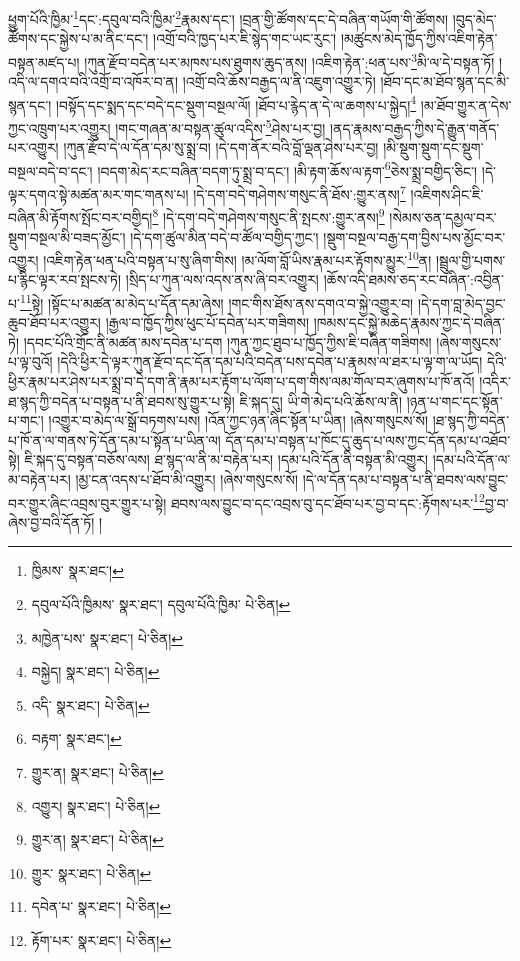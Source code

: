 ཕྱུག་པོའི་ཁྱིམ་\footnote{ཁྱིམས་  སྣར་ཐང་། }དང་:དབུལ་བའི་ཁྱིམ་\footnote{དབུལ་པོའི་ཁྱིམས་  སྣར་ཐང་། དབུལ་པོའི་ཁྱིམ་  པེ་ཅིན། }རྣམས་དང་། །བྲན་གྱི་ཚོགས་དང་དེ་བཞིན་གཡོག་གི་ཚོགས། །བུད་མེད་ཚོགས་དང་སྐྱེས་པ་མ་ནིང་དང་། །འགྲོ་བའི་ཁྱད་པར་ཇི་སྙེད་གང་ཡང་རུང་། །མཚུངས་མེད་ཁྱོད་ཀྱིས་འཇིག་རྟེན་བསྟན་མཛད་པ། །ཀུན་རྫོབ་བདེན་པར་མཁས་པས་ཐུགས་ཆུད་ནས། །འཇིག་རྟེན་:ཕན་པས་\footnote{མཁྱེན་པས་  སྣར་ཐང་།  པེ་ཅིན། }མི་ལ་དེ་བསྟན་ཏོ། །འདི་ལ་དགའ་བའི་འགྲོ་བ་འཁོར་བ་ན། །འགྲོ་བའི་ཆོས་བརྒྱད་ལ་ནི་འཇུག་འགྱུར་ཏེ། །ཐོབ་དང་མ་ཐོབ་སྙན་དང་མི་སྙན་དང་། །བསྟོད་དང་སྨད་དང་བདེ་དང་སྡུག་བསྔལ་ལོ། །ཐོབ་པ་རྙེད་ན་དེ་ལ་ཆགས་པ་སྐྱེད།\footnote{བསྐྱེད།  སྣར་ཐང་།  པེ་ཅིན། } །མ་ཐོབ་གྱུར་ན་དེས་ཀྱང་འཁྲུག་པར་འགྱུར། །གང་གཞན་མ་བསྟན་ཚུལ་འདིས་\footnote{འདི་  སྣར་ཐང་།  པེ་ཅིན། }ཤེས་པར་བྱ། །ནད་རྣམས་བརྒྱད་ཀྱིས་དེ་རྒྱུན་གནོད་པར་འགྱུར། །ཀུན་རྫོབ་དེ་ལ་དོན་དམ་སུ་སྨྲ་བ། །དེ་དག་ནོར་བའི་བློ་ལྡན་ཤེས་པར་བྱ། །མི་སྡུག་སྡུག་དང་སྡུག་བསྔལ་བདེ་བ་དང་། །བདག་མེད་རང་བཞིན་བདག་ཏུ་སྨྲ་བ་དང་། །མི་རྟག་ཆོས་ལ་རྟག་\footnote{བརྟག་  སྣར་ཐང་། }ཅེས་སྨྲ་བགྱིད་ཅིང་། །དེ་ལྟར་དགའ་སྟེ་མཚན་མར་གང་གནས་པ། །དེ་དག་བདེ་གཤེགས་གསུང་ནི་ཐོས་:གྱུར་ནས།\footnote{གྱུར་ན།  སྣར་ཐང་།  པེ་ཅིན། } །འཇིགས་ཤིང་ཇི་བཞིན་མི་རྟོགས་སྤོང་བར་བགྱིད།\footnote{འགྱུར།  སྣར་ཐང་།  པེ་ཅིན། } །དེ་དག་བདེ་གཤེགས་གསུང་ནི་སྤངས་:གྱུར་ནས།\footnote{གྱུར་ན།  སྣར་ཐང་།  པེ་ཅིན། } །སེམས་ཅན་དམྱལ་བར་སྡུག་བསྔལ་མི་བཟད་མྱོང་། །དེ་དག་ཚུལ་མིན་བདེ་བ་ཚོལ་བགྱིད་ཀྱང་། །སྡུག་བསྔལ་བརྒྱ་དག་བྱིས་པས་མྱོང་བར་འགྱུར། །འཇིག་རྟེན་ཕན་པའི་བསྟན་པ་སུ་ཞིག་གིས། །མ་ལོག་བློ་ཡིས་རྣམ་པར་རྟོགས་མྱུར་\footnote{གྱུར་  སྣར་ཐང་།  པེ་ཅིན། }ན། །སྦྲུལ་གྱི་པགས་པ་རྙིང་ལྟར་རབ་སྤངས་ཏེ། །སྲིད་པ་ཀུན་ལས་འདས་ནས་ཞི་བར་འགྱུར། །ཆོས་འདི་ཐམས་ཅད་རང་བཞིན་:འབྱིན་པ་\footnote{དབེན་པ་  སྣར་ཐང་།  པེ་ཅིན། }སྟེ། །སྟོང་པ་མཚན་མ་མེད་པ་དོན་དམ་ཞེས། །གང་གིས་ཐོས་ནས་དགའ་བ་སྐྱེ་འགྱུར་བ། །དེ་དག་བླ་མེད་བྱང་ཆུབ་ཐོབ་པར་འགྱུར། །རྒྱལ་བ་ཁྱོད་ཀྱིས་ཕུང་པོ་དབེན་པར་གཟིགས། །ཁམས་དང་སྐྱེ་མཆེད་རྣམས་ཀྱང་དེ་བཞིན་ཏེ། །དབང་པོའི་གྲོང་ནི་མཚན་མས་དབེན་པ་དག །ཀུན་ཀྱང་ཐུབ་པ་ཁྱོད་ཀྱིས་ཇི་བཞིན་གཟིགས། །ཞེས་གསུངས་པ་ལྟ་བུའོ། །དེའི་ཕྱིར་དེ་ལྟར་ཀུན་རྫོབ་དང་དོན་དམ་པའི་བདེན་པས་དབེན་པ་རྣམས་ལ་ཐར་པ་ལྟ་ག་ལ་ཡོད། དེའི་ཕྱིར་རྣམ་པར་ཤེས་པར་སྨྲ་བ་དེ་དག་ནི་རྣམ་པར་རྟོག་པ་ལོག་པ་དག་གིས་ལམ་གོལ་བར་ཞུགས་པ་ཁོ་ནའོ། །འདིར་ཐ་སྙད་ཀྱི་བདེན་པ་བསྟན་པ་ནི་ཐབས་སུ་གྱུར་པ་སྟེ། ཇི་སྐད་དུ། ཡི་གེ་མེད་པའི་ཆོས་ལ་ནི། །ཉན་པ་གང་དང་སྟོན་པ་གང་། །འགྱུར་བ་མེད་ལ་སྒྲོ་བཏགས་པས། །འོན་ཀྱང་ཉན་ཞིང་སྟོན་པ་ཡིན། །ཞེས་གསུངས་སོ། །ཐ་སྙད་ཀྱི་བདེན་པ་ཁོ་ན་ལ་གནས་ཏེ་དོན་དམ་པ་སྟོན་པ་ཡིན་ལ། དོན་དམ་པ་བསྟན་པ་ཁོང་དུ་ཆུད་པ་ལས་ཀྱང་དོན་དམ་པ་འཐོབ་སྟེ། ཇི་སྐད་དུ་བསྟན་བཅོས་ལས། ཐ་སྙད་ལ་ནི་མ་བརྟེན་པར། །དམ་པའི་དོན་ནི་བསྟན་མི་འགྱུར། །དམ་པའི་དོན་ལ་མ་བརྟེན་པར། །མྱ་ངན་འདས་པ་ཐོབ་མི་འགྱུར། །ཞེས་གསུངས་སོ། །དེ་ལ་དོན་དམ་པ་བསྟན་པ་ནི་ཐབས་ལས་བྱུང་བར་གྱུར་ཞིང་འབྲས་བུར་གྱུར་པ་སྟེ། ཐབས་ལས་བྱུང་བ་དང་འབྲས་བུ་དང་ཐོབ་པར་བྱ་བ་དང་:རྟོགས་པར་\footnote{རྟོག་པར་  སྣར་ཐང་།  པེ་ཅིན། }བྱ་བ་ཞེས་བྱ་བའི་དོན་ཏོ། །
